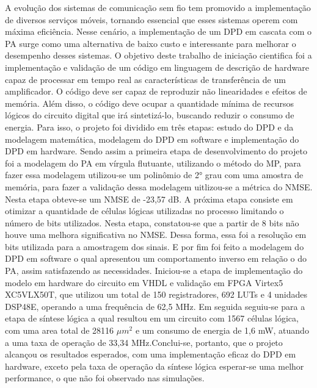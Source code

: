 A evolução dos sistemas de comunicação sem fio tem promovido a implementação de diversos serviços móveis, tornando essencial que esses sistemas operem com máxima eficiência. Nesse cenário, a implementação de um DPD em cascata com o PA surge como uma alternativa de baixo custo e interessante para melhorar o desempenho desses sistemas.
O objetivo deste trabalho de iniciação cientifica foi a implementação e validação de um código em linguagem de descrição de hardware capaz de processar em tempo real as características de transferência de um amplificador. O código deve ser capaz de reproduzir não linearidades e efeitos de memória. Além disso, o código deve ocupar a quantidade mínima de recursos lógicos do circuito digital que irá sintetizá-lo, buscando reduzir o consumo de energia. Para isso, o projeto foi dividido em três etapas: estudo do DPD e da modelagem matemática, modelagem do DPD em software e implementação do DPD em hardware.
Sendo assim a primeira etapa de desenvolvimento do projeto foi a modelagem do PA em vírgula flutuante, utilizando o método do MP, para fazer essa modelagem utilizou-se um polinômio de 2° grau com uma amostra de memória, para fazer a validação dessa modelagem uitlizou-se a métrica do NMSE. Nesta etapa obteve-se um NMSE de -23,57 dB. A próxima etapa consiste em otimizar a quantidade de células lógicas utilizadas no processo limitando o número de bits utilizados. Nesta etapa, constatou-se que a partir de 8 bits não houve uma melhora significativa no NMSE. Dessa forma, essa foi a resolução em bits utilizada para a amostragem dos sinais. E por fim foi feito a modelagem do DPD em software o qual apresentou um comportamento inverso em relação o do PA, assim satisfazendo as necessidades. Iniciou-se a etapa de implementação do modelo em hardware do circuito em VHDL e validação em FPGA Virtex5 XC5VLX50T, que utilizou um total de 150 registradores, 692 LUTs e 4 unidades DSP48E, operando a uma frequência de 62,5 MHz. Em seguida seguiu-se para a etapa de síntese lógica a qual resultou em um circuito com 1567 células lógica, com uma area total de 28116 $ \mu m^2$ e um consumo de energia de 1,6 mW, atuando a uma taxa de operação de 33,34 MHz.Conclui-se, portanto, que o projeto alcançou os resultados esperados, com uma implementação eficaz do DPD em hardware, exceto pela taxa de operação da síntese lógica esperar-se uma melhor performance, o que não foi observado nas simulações.